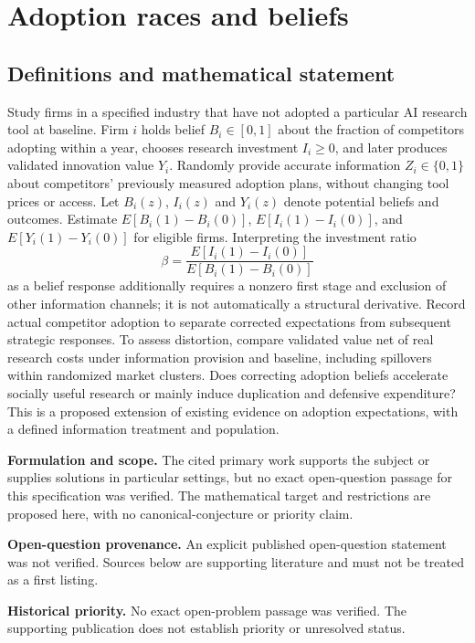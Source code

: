 \documentclass[11pt]{article}
\begin{document}
\section*{Adoption races and beliefs}\label{30007695}
\subsection{Definitions and mathematical statement}
Study firms in a specified industry that have not adopted a particular AI research tool at baseline. Firm \(i\) holds belief \(B_i\in[0,1]\) about the fraction of competitors adopting within a year, chooses research investment \(I_i\geq0\), and later produces validated innovation value \(Y_i\). Randomly provide accurate information \(Z_i\in\{0,1\}\) about competitors' previously measured adoption plans, without changing tool prices or access. Let \(B_i(z)\), \(I_i(z)\) and \(Y_i(z)\) denote potential beliefs and outcomes. Estimate \(E[B_i(1)-B_i(0)]\), \(E[I_i(1)-I_i(0)]\), and \(E[Y_i(1)-Y_i(0)]\) for eligible firms. Interpreting the investment ratio
\[
\beta=\frac{E[I_i(1)-I_i(0)]}{E[B_i(1)-B_i(0)]}
\]
as a belief response additionally requires a nonzero first stage and exclusion of other information channels; it is not automatically a structural derivative. Record actual competitor adoption to separate corrected expectations from subsequent strategic responses. To assess distortion, compare validated value net of real research costs under information provision and baseline, including spillovers within randomized market clusters. Does correcting adoption beliefs accelerate socially useful research or mainly induce duplication and defensive expenditure? This is a proposed extension of existing evidence on adoption expectations, with a defined information treatment and population.

\par\textbf{Formulation and scope.} The cited primary work supports the subject or supplies solutions in particular settings, but no exact open-question passage for this specification was verified. The mathematical target and restrictions are proposed here, with no canonical-conjecture or priority claim.

\par\textbf{Open-question provenance.} An explicit published open-question statement was not verified. Sources below are supporting literature and must not be treated as a first listing.

\par\textbf{Historical priority.} No exact open-problem passage was verified. The supporting publication does not establish priority or unresolved status.
\end{document}
